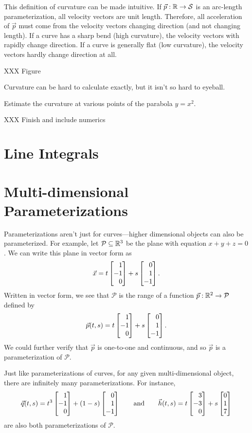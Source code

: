 This definition of curvature can be made intuitive.  If $\vec p:\mathbb{R}\to\mathcal S$ is an arc-length parameterization,
all velocity vectors are unit length.  Therefore, all acceleration of $\vec p$ must come from
the velocity vectors changing direction (and not changing length).  If a curve has a sharp bend (high curvature),
the velocity vectors with rapidly change direction.  If a curve is generally flat (low curvature),
the velocity vectors hardly change direction at all.

XXX Figure

Curvature can be hard to calculate exactly, but it isn't so hard to eyeball.

\begin{example}
	Estimate the curvature at various points of the parabola $y=x^2$.

	XXX Finish and include numerics
\end{example}

\begin{exercises}
\end{exercises}

\section{Line Integrals}

\section{Multi-dimensional Parameterizations}

Parameterizations aren't just for curves---higher dimensional objects can also be parameterized.
For example, let $\mathcal P\subseteq \mathbb{R}^3$ be the plane with equation $x+y+z=0$.  We can write this plane
in vector form as 
\[
	\vec x = t\mat{1\\-1\\0} + s\mat{0\\1\\-1}.	
\]
Written in vector form, we see that $\mathcal P$ is the range of a function $\vec p:\mathbb{R}^2\to\mathcal P$
defined by 
\[
	\vec p(t,s) = t\mat{1\\-1\\0} + s\mat{0\\1\\-1}.
\]
We could further verify that $\vec p$ is one-to-one and continuous, and so $\vec p$ is a parameterization
of $\mathcal P$.

Just like parameterizations of curves, for any given multi-dimensional object, there are
infinitely many parameterizations.  For instance,
\[
	\vec q(t,s) = t^3\mat{1\\-1\\0} + (1-s)\mat{0\\1\\-1}\qquad\text{and}\qquad
	\vec h(t,s) = t\mat{3\\-3\\0} + s\mat{0\\1\\7}
\]
are also both parameterizations of $\mathcal P$.

